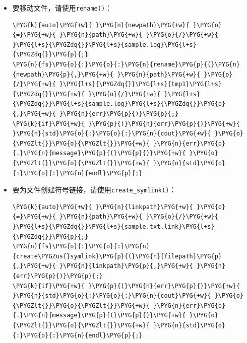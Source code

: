 \begin{itemize}

\item 要移动文件，请使用\texttt{rename()}：



\begin{codeblockbg}
\begin{Verbatim}[commandchars=\\\{\},breaklines=true,breakanywhere=true,fontsize=\codefont,xleftmargin=17bp]
\PYG{k}{auto}\PYG{+w}{ }\PYG{n}{newpath}\PYG{+w}{ }\PYG{o}{=}\PYG{+w}{ }\PYG{n}{path}\PYG{+w}{ }\PYG{o}{/}\PYG{+w}{ }\PYG{l+s}{\PYGZdq{}}\PYG{l+s}{sample.log}\PYG{l+s}{\PYGZdq{}}\PYG{p}{;}
\PYG{n}{fs}\PYG{o}{:}\PYG{o}{:}\PYG{n}{rename}\PYG{p}{(}\PYG{n}{newpath}\PYG{p}{,}\PYG{+w}{ }\PYG{n}{path}\PYG{+w}{ }\PYG{o}{/}\PYG{+w}{ }\PYG{l+s}{\PYGZdq{}}\PYG{l+s}{tmp1}\PYG{l+s}{\PYGZdq{}}\PYG{+w}{ }\PYG{o}{/}\PYG{+w}{ }\PYG{l+s}{\PYGZdq{}}\PYG{l+s}{sample.log}\PYG{l+s}{\PYGZdq{}}\PYG{p}{,}\PYG{+w}{ }\PYG{n}{err}\PYG{p}{)}\PYG{p}{;}
\PYG{k}{if}\PYG{+w}{ }\PYG{p}{(}\PYG{n}{err}\PYG{p}{)}\PYG{+w}{ }\PYG{n}{std}\PYG{o}{:}\PYG{o}{:}\PYG{n}{cout}\PYG{+w}{ }\PYG{o}{\PYGZlt{}}\PYG{o}{\PYGZlt{}}\PYG{+w}{ }\PYG{n}{err}\PYG{p}{.}\PYG{n}{message}\PYG{p}{(}\PYG{p}{)}\PYG{+w}{ }\PYG{o}{\PYGZlt{}}\PYG{o}{\PYGZlt{}}\PYG{+w}{ }\PYG{n}{std}\PYG{o}{:}\PYG{o}{:}\PYG{n}{endl}\PYG{p}{;}
\end{Verbatim}
\end{codeblockbg}



\item 要为文件创建符号链接，请使用\texttt{create\_\allowbreak{}symlink()}：



\begin{codeblockbg}
\begin{Verbatim}[commandchars=\\\{\},breaklines=true,breakanywhere=true,fontsize=\codefont,xleftmargin=17bp]
\PYG{k}{auto}\PYG{+w}{ }\PYG{n}{linkpath}\PYG{+w}{ }\PYG{o}{=}\PYG{+w}{ }\PYG{n}{path}\PYG{+w}{ }\PYG{o}{/}\PYG{+w}{ }\PYG{l+s}{\PYGZdq{}}\PYG{l+s}{sample.txt.link}\PYG{l+s}{\PYGZdq{}}\PYG{p}{;}
\PYG{n}{fs}\PYG{o}{:}\PYG{o}{:}\PYG{n}{create\PYGZus{}symlink}\PYG{p}{(}\PYG{n}{filepath}\PYG{p}{,}\PYG{+w}{ }\PYG{n}{linkpath}\PYG{p}{,}\PYG{+w}{ }\PYG{n}{err}\PYG{p}{)}\PYG{p}{;}
\PYG{k}{if}\PYG{+w}{ }\PYG{p}{(}\PYG{n}{err}\PYG{p}{)}\PYG{+w}{ }\PYG{n}{std}\PYG{o}{:}\PYG{o}{:}\PYG{n}{cout}\PYG{+w}{ }\PYG{o}{\PYGZlt{}}\PYG{o}{\PYGZlt{}}\PYG{+w}{ }\PYG{n}{err}\PYG{p}{.}\PYG{n}{message}\PYG{p}{(}\PYG{p}{)}\PYG{+w}{ }\PYG{o}{\PYGZlt{}}\PYG{o}{\PYGZlt{}}\PYG{+w}{ }\PYG{n}{std}\PYG{o}{:}\PYG{o}{:}\PYG{n}{endl}\PYG{p}{;}
\end{Verbatim}
\end{codeblockbg}



\end{itemize}
